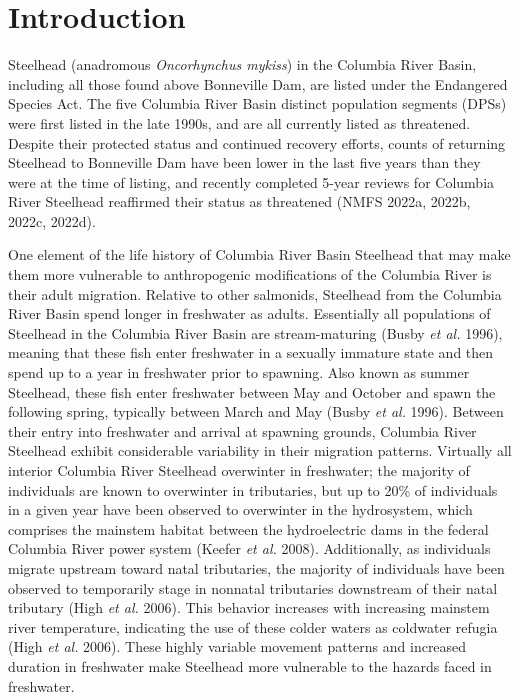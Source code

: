 \documentclass[
  12pt,
]{report}
\begin{document}
\hypertarget{introduction}{%
\chapter{Introduction}\label{introduction}}

Steelhead (anadromous \emph{Oncorhynchus mykiss}) in the Columbia River
Basin, including all those found above Bonneville Dam, are listed under
the Endangered Species Act. The five Columbia River Basin distinct
population segments (DPSs) were first listed in the late 1990s, and are
all currently listed as threatened. Despite their protected status and
continued recovery efforts, counts of returning Steelhead to Bonneville
Dam have been lower in the last five years than they were at the time of
listing, and recently completed 5-year reviews for Columbia River
Steelhead reaffirmed their status as threatened (NMFS 2022a, 2022b,
2022c, 2022d).

One element of the life history of Columbia River Basin Steelhead that
may make them more vulnerable to anthropogenic modifications of the
Columbia River is their adult migration. Relative to other salmonids,
Steelhead from the Columbia River Basin spend longer in freshwater as
adults. Essentially all populations of Steelhead in the Columbia River
Basin are stream-maturing (Busby \emph{et al.} 1996), meaning that these
fish enter freshwater in a sexually immature state and then spend up to
a year in freshwater prior to spawning. Also known as summer Steelhead,
these fish enter freshwater between May and October and spawn the
following spring, typically between March and May (Busby \emph{et al.}
1996). Between their entry into freshwater and arrival at spawning
grounds, Columbia River Steelhead exhibit considerable variability in
their migration patterns. Virtually all interior Columbia River
Steelhead overwinter in freshwater; the majority of individuals are
known to overwinter in tributaries, but up to 20\% of individuals in a
given year have been observed to overwinter in the hydrosystem, which
comprises the mainstem habitat between the hydroelectric dams in the
federal Columbia River power system (Keefer \emph{et al.} 2008).
Additionally, as individuals migrate upstream toward natal tributaries,
the majority of individuals have been observed to temporarily stage in
nonnatal tributaries downstream of their natal tributary (High \emph{et
al.} 2006). This behavior increases with increasing mainstem river
temperature, indicating the use of these colder waters as coldwater
refugia (High \emph{et al.} 2006). These highly variable movement
patterns and increased duration in freshwater make Steelhead more
vulnerable to the hazards faced in freshwater.
\end{document}
